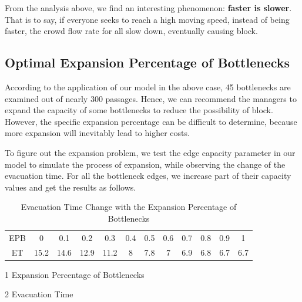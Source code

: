 \documentclass[a4paper,12pt]{article}
\begin{document}
From the analysis above, we find an interesting phenomenon: \textbf{faster is slower}. That is to say, if everyone seeks to reach a high moving speed, instead of being faster, the crowd flow rate for all slow down, eventually causing block.

\subsection{Optimal Expansion Percentage of Bottlenecks}

According to the application of our model in the above case, 45 bottlenecks are examined out of nearly 300 passages. Hence, we can recommend the managers to expand the capacity of some bottlenecks to reduce the possibility of block. However, the specific expansion percentage can be difficult to determine, because more expansion will inevitably lead to higher costs.

To figure out the expansion problem, we test the edge capacity parameter in our model to simulate the process of expansion, while observing the change of the evacuation time. For all the bottleneck edges, we increase part of their capacity values and get the results as follows.

\begin{table}[ht]
  \caption{Evacuation Time Change with the Expansion Percentage of Bottlenecks}
  \label{tab2}
  \centering
  \begin{threeparttable}
    \setlength{\extrarowheight}{2mm}
    \begin{tabular}{|c|ccccccccccc|}
    \hline
    \rowcolor[gray]{0.9}
    EPB\tnote{1} &0       & 0.1   & 0.2  & 0.3  & 0.4  & 0.5  & 0.6  & 0.7  & 0.8 &0.9    &1\\
    \rowcolor{mycyan}
    ET\tnote{2} &15.2    &14.6   & 12.9 & 11.2 & 8 & 7.8 & 7 & 6.9 & 6.8 & 6.7 & 6.7\\
    \hline
    \end{tabular}
        \begin{tablenotes}
        \footnotesize
        \item[1] Expansion Percentage of Bottlenecks
        \item[2] Evacuation Time
      \end{tablenotes}
          \end{threeparttable}
\end{table}
\end{document}

